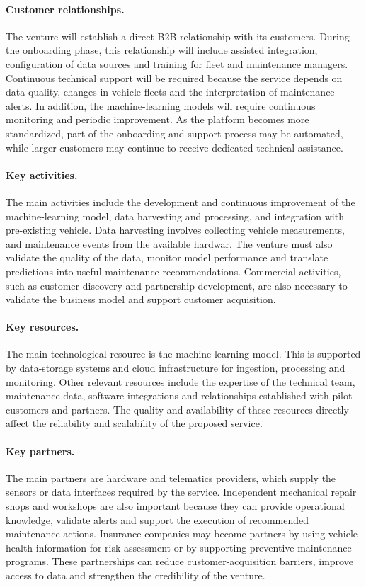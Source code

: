 \documentclass[11pt,a4paper]{article}
\begin{document}
\paragraph{Customer relationships.}
The venture will establish a direct B2B relationship with its customers. During the onboarding phase, this relationship will include assisted integration, configuration of data sources and training for fleet and maintenance managers. Continuous technical support will be required because the service depends on data quality, changes in vehicle fleets and the interpretation of maintenance alerts. In addition, the machine-learning models will require continuous monitoring and periodic improvement. As the platform becomes more standardized, part of the onboarding and support process may be automated, while larger customers may continue to receive dedicated technical assistance.

\paragraph{Key activities.}
The main activities include the development and continuous improvement of the machine-learning model, data harvesting and processing, and integration with pre-existing vehicle. Data harvesting involves collecting vehicle measurements, and maintenance events from the available hardwar. The venture must also validate the quality of the data, monitor model performance and translate predictions into useful maintenance recommendations. Commercial activities, such as customer discovery and partnership development, are also necessary to validate the business model and support customer acquisition.

\paragraph{Key resources.}
The main technological resource is the machine-learning model. This is supported by data-storage systems and cloud infrastructure for ingestion, processing and monitoring. Other relevant resources include the expertise of the technical team, maintenance data, software integrations and relationships established with pilot customers and partners. The quality and availability of these resources directly affect the reliability and scalability of the proposed service.

\paragraph{Key partners.}
The main partners are hardware and telematics providers, which supply the sensors or data interfaces required by the service. Independent mechanical repair shops and workshops are also important because they can provide operational knowledge, validate alerts and support the execution of recommended maintenance actions. Insurance companies may become partners by using vehicle-health information for risk assessment or by supporting preventive-maintenance programs. These partnerships can reduce customer-acquisition barriers, improve access to data and strengthen the credibility of the venture.
\end{document}
